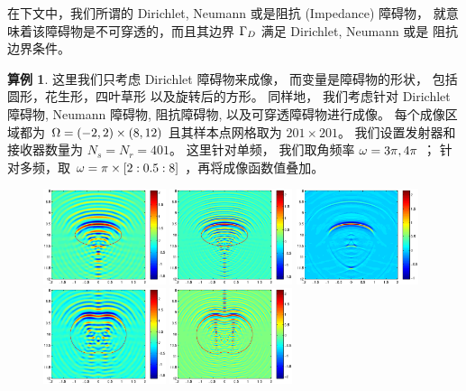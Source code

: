 {\bigskip

在下文中，我们所谓的 Dirichlet, Neumann 或是阻抗 (Impedance) 障碍物， 就意味着该障碍物是不可穿透的，而且其边界 $\Gamma_D$ 满足 Dirichlet, Neumann 或是 阻抗边界条件。


\bigskip
\textbf{算例 1}. 这里我们只考虑  Dirichlet 障碍物来成像， 而变量是障碍物的形状， 包括圆形，花生形，四叶草形 以及旋转后的方形。 同样地， 
我们考虑针对 Dirichlet 障碍物,  Neumann 障碍物, 阻抗障碍物, 以及可穿透障碍物进行成像。 每个成像区域都为 $\Omega=(-2,2) \times (8, 12)$ 且其样本点网格取为 $201 \times 201$。 我们设置发射器和接收器数量为 $N_s = N_r = 401$。 这里针对单频， 我们取角频率 $\omega = 3\pi,4\pi$ ； 针对多频，取 $\omega=\pi\times[2:0.5:8]$ ，再将成像函数值叠加。
\begin{figure}[htbp]
	\centering
	\includegraphics[width=0.32\textwidth]{./Img/graphic/circle_3pi.eps}
	\includegraphics[width=0.32\textwidth]{./Img/graphic/circle_5pi.eps}
	\includegraphics[width=0.32\textwidth]{./Img/graphic/circle.eps}
	\includegraphics[width=0.32\textwidth]{./Img/graphic/peanut_3pi.eps}
	\includegraphics[width=0.32\textwidth]{./Img/graphic/peanut_5pi.eps}

\end{figure}}
